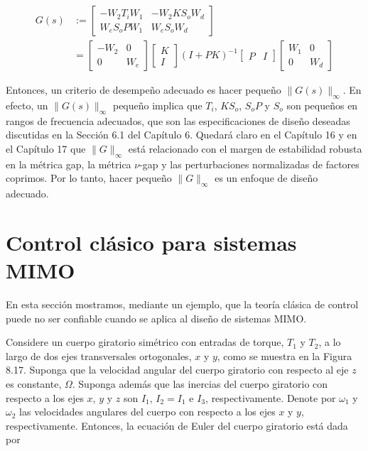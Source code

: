 $$
\begin{aligned}
G(s) & :=\left[\begin{array}{cc}
-W_{2} T_{i} W_{1} & -W_{2} K S_{o} W_{d} \\
W_{e} S_{o} P W_{1} & W_{e} S_{o} W_{d}
\end{array}\right] \\
& =\left[\begin{array}{cc}
-W_{2} & 0 \\
0 & W_{e}
\end{array}\right]\left[\begin{array}{c}
K \\
I
\end{array}\right](I+P K)^{-1}\left[\begin{array}{ll}
P & I
\end{array}\right]\left[\begin{array}{cc}
W_{1} & 0 \\
0 & W_{d}
\end{array}\right]
\end{aligned}
$$


Entonces, un criterio de desempeño adecuado es hacer pequeño $\|G(s)\|_{\infty}$. En efecto, un $\|G(s)\|_{\infty}$ pequeño implica que $T_{i}$, $K S_{o}$, $S_{o} P$ y $S_{o}$ son pequeños en rangos de frecuencia adecuados, que son las especificaciones de diseño deseadas discutidas en la Sección 6.1 del Capítulo 6. Quedará claro en el Capítulo 16 y en el Capítulo 17 que $\|G\|_{\infty}$ está relacionado con el margen de estabilidad robusta en la métrica gap, la métrica $\nu$-gap y las perturbaciones normalizadas de factores coprimos. Por lo tanto, hacer pequeño $\|G\|_{\infty}$ es un enfoque de diseño adecuado.

\section{Control clásico para sistemas MIMO}
En esta sección mostramos, mediante un ejemplo, que la teoría clásica de control puede no ser confiable cuando se aplica al diseño de sistemas MIMO.

Considere un cuerpo giratorio simétrico con entradas de torque, $T_{1}$ y $T_{2}$, a lo largo de dos ejes transversales ortogonales, $x$ y $y$, como se muestra en la Figura 8.17. Suponga que la velocidad angular del cuerpo giratorio con respecto al eje $z$ es constante, $\Omega$. Suponga además que las inercias del cuerpo giratorio con respecto a los ejes $x$, $y$ y $z$ son $I_{1}$, $I_{2}=I_{1}$ e $I_{3}$, respectivamente. Denote por $\omega_{1}$ y $\omega_{2}$ las velocidades angulares del cuerpo con respecto a los ejes $x$ y $y$, respectivamente. Entonces, la ecuación de Euler del cuerpo giratorio está dada por

